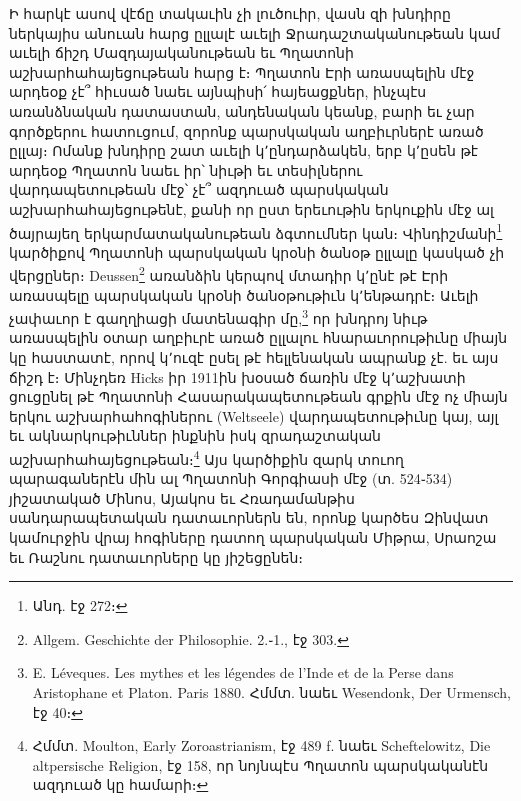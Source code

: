 \documentclass{article}
\begin{document}
{Ի հարկէ ասով վէճը տակաւին չի լուծուիր, վասն զի խնդիրը ներկայիս անուան հարց ըլլալէ աւելի Ջրադաշտականութեան կամ աւելի ճիշդ Մազդայականութեան եւ Պղատոնի աշխարհահայեցութեան հարց է։ Պղատոն Էրի առասպելին մէջ արդեօք չէ՞ հիւսած նաեւ այնպիսի՛ հայեացքներ, ինչպէս առանձնական դատաստան, անդենական կեանք, բարի եւ չար գործքերու հատուցում, զորոնք պարսկական աղբիւրներէ առած ըլլայ։ Ոմանք խնդիրը շատ աւելի կ՚ընդարձակեն, երբ կ՚ըսեն թէ արդեօք Պղատոն նաեւ իր՝ նիւթի եւ տեսիլներու վարդապետութեան մէջ՝ չէ՞ ազդուած պարսկական աշխարհահայեցութենէ, քանի որ ըստ երեւութին երկուքին մէջ ալ ծայրայեղ երկարմատականութեան ձգտումներ կան։ Վինդիշմանի\footnote{Անդ. էջ 272։} կարծիքով Պղատոնի պարսկական կրօնի ծանօթ ըլլալը կասկած չի վերցըներ։ Deussen\footnote{Allgem. Geschichte der Philosophie. 2.֊1., էջ 303.} առանձին կերպով մտադիր կ՚ընէ թէ Էրի առասպելը պարսկական կրօնի ծանօթութիւն կ՚ենթադրէ։ Աւելի չափաւոր է գաղղիացի մատենագիր մը,\footnote{E. Léveques. Les mythes et les légendes de l'Inde et de la Perse dans Aristophane et Platon. Paris 1880. Հմմտ. նաեւ Wesendonk, Der Urmensch, էջ 40։} որ խնդրոյ նիւթ առասպելին օտար աղբիւրէ առած ըլլալու հնարաւորութիւնը միայն կը հաստատէ, որով կ՚ուզէ ըսել թէ հելլենական ապրանք չէ. եւ այս ճիշդ է։ Մինչդեռ Hicks իր 1911ին խօսած ճառին մէջ կ՚աշխատի ցուցընել թէ Պղատոնի Հասարակապետութեան գրքին մէջ ոչ միայն երկու աշխարհահոգիներու (Weltseele) վարդապետութիւնը կայ, այլ եւ ակնարկութիւններ ինքնին իսկ զրադաշտական աշխարհահայեցութեան։\footnote{Հմմտ. Moulton, Early Zoroastrianism, էջ 489 f. նաեւ Scheftelowitz, Die altpersische Religion, էջ 158, որ նոյնպէս Պղատոն պարսկականէն ազդուած կը համարի։} Այս կարծիքին զարկ տուող պարագաներէն մին ալ Պղատոնի Գորգիասի մէջ (տ. 524֊534) յիշատակած Մինոս, Այակոս եւ Հռադամանթիս սանդարապետական դատաւորներն են, որոնք կարծես Զինվատ կամուրջին վրայ հոգիները դատող պարսկական Միթրա, Սրաոշա եւ Ռաշնու դատաւորները կը յիշեցընեն։

}
\end{document}
